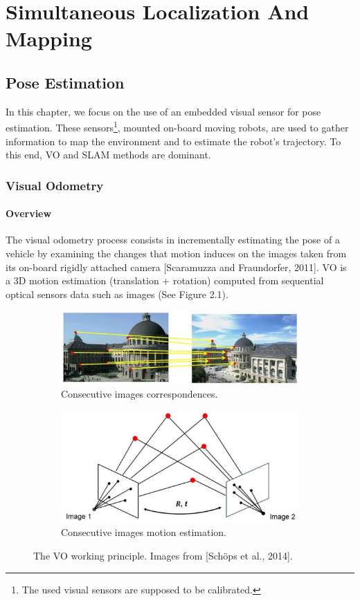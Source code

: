 \chapter{Simultaneous Localization And Mapping}
\section{Pose Estimation}
In this chapter, we focus on the use of an embedded visual sensor for pose estimation. These sensors\footnote{The used visual sensors are supposed to be calibrated.}, mounted on-board moving robots, are used to gather information to map the environment and to estimate the robot’s trajectory. To this end, VO and SLAM methods are dominant.
\subsection{Visual Odometry}
\subsubsection{Overview}
The visual odometry process consists in incrementally estimating the pose of a vehicle by examining the changes that motion induces on the images taken from its on-board rigidly attached camera [Scaramuzza and Fraundorfer, 2011]. VO is a 3D motion estimation (translation + rotation) computed from sequential optical sensors data such as images (See Figure 2.1).
\begin{figure}
    \centering
    \begin{subfigure}[h]{0.9\linewidth}
        \centering
        \includegraphics[width=\linewidth]{assets/2_1_a.png}
        \caption{{Consecutive images correspondences.}}
        \label{fig:subfigure1}
    \end{subfigure}
    \hfill
    \begin{subfigure}[h]{0.8\linewidth}
        \centering
        \includegraphics[width=\linewidth]{assets/2_1_b.png}
        \caption{{Consecutive images motion estimation.}}
        \label{fig:subfigure2}
    \end{subfigure}
    \caption{The VO working principle. Images from [Schöps et al., 2014].}
\end{figure}

